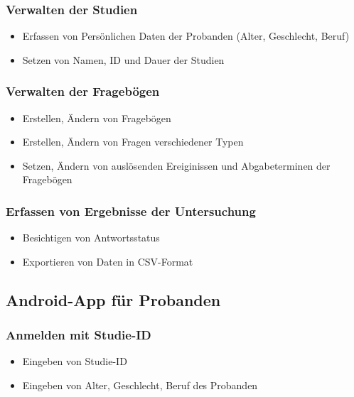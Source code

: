 \documentclass[a4paper]{scrreprt}
\begin{document}
                \subsubsection{Verwalten der Studien}
                    \begin{itemize}
                        \item Erfassen von Pers\"onlichen Daten der Probanden (Alter, Geschlecht, Beruf)
                        \item Setzen von Namen, ID und Dauer der Studien
                    \end{itemize}

                \subsubsection{Verwalten der Frageb\"ogen}
                    \begin{itemize}
                        \item Erstellen, Ändern von Fragebögen
                        \item Erstellen, \"Andern von Fragen verschiedener Typen
                        \item Setzen, \"Andern von auslösenden Ereiginissen und Abgabeterminen der Frageb\"ogen
                    \end{itemize}

                \subsubsection{Erfassen von Ergebnisse der Untersuchung}
                    \begin{itemize}
                        \item Besichtigen von \gls{Antwortsstatus}
                        \item Exportieren von Daten in CSV-Format
                    \end{itemize}
            \vspace*{0.5cm}

            \subsection{\gls{Android-App} f\"ur \gls{Proband}en}

                \subsubsection{Anmelden mit Studie-ID}
                    \begin{itemize}
                        \item Eingeben von Studie-ID
                        \item Eingeben von Alter, Geschlecht, Beruf des Probanden
                    \end{itemize}
\end{document}

